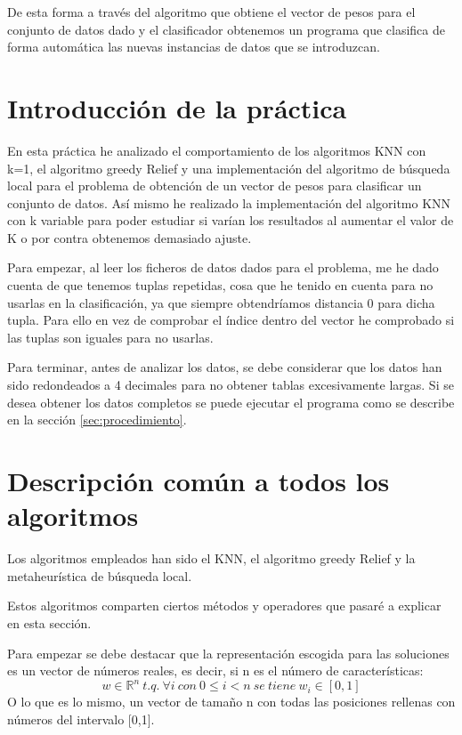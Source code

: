 \documentclass[12pt,a4paper]{article}
\begin{document}
	De esta forma a través del algoritmo que obtiene el vector de pesos para el conjunto de datos dado y el clasificador obtenemos un programa que clasifica de forma automática las nuevas instancias de datos que se introduzcan.

	\newpage

	\section{Introducción de la práctica}
	\label{sec:introPractica}

	En esta práctica he analizado el comportamiento de los algoritmos KNN con k=1, el algoritmo greedy Relief y una implementación del algoritmo de búsqueda local para el problema de obtención de un vector de pesos para clasificar un conjunto de datos. Así mismo he realizado la implementación del algoritmo KNN con k variable para poder estudiar si varían los resultados al aumentar el valor de K o por contra obtenemos demasiado ajuste.

	Para empezar, al leer los ficheros de datos dados para el problema, me he dado cuenta de que tenemos tuplas repetidas, cosa que he tenido en cuenta para no usarlas en la clasificación, ya que siempre obtendríamos distancia 0 para dicha tupla. Para ello en vez de comprobar el índice dentro del vector he comprobado si las tuplas son iguales para no usarlas.

	Para terminar, antes de analizar los datos, se debe considerar que los datos han sido redondeados a 4 decimales para no obtener tablas excesivamente largas. Si se desea obtener los datos completos se puede ejecutar el programa como se describe en la sección \hyperref[sec:procedimiento]{\ref{sec:procedimiento}}.


	\section{Descripción común a todos los algoritmos}
	Los algoritmos empleados han sido el KNN, el algoritmo greedy Relief y la metaheurística de búsqueda local.

	Estos algoritmos comparten ciertos métodos y operadores que pasaré a explicar en esta sección.

	Para empezar se debe destacar que la representación escogida para las soluciones es un vector de números reales, es decir, si n es el número de características:
	$$w\in \mathbb{R}^n \ t.q. \ \forall i \ con \ 0\leq i < n \ se \ tiene \ w_i \in [0,1]$$
	O lo que es lo mismo, un vector de tamaño n con todas las posiciones rellenas con números del intervalo [0,1].
\end{document}
